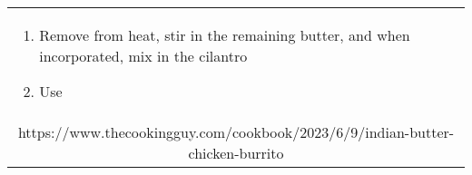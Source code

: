 \documentclass[web-recipes.tex]{subfiles}
\begin{document}
\begin{mdframed}[nobreak]
\begin{tabular}{l}
\begin{minipage}[t]{0.55\textwidth}
\begin{enumerate}
        \item Remove from heat, stir in the remaining butter, and when
          incorporated, mix in the cilantro
        \item Use
      \end{enumerate}
    \end{minipage} \vspace{3ex}\\
    \multicolumn{1}{c}{\small\ttfamily https://www.thecookingguy.com/cookbook/2023/6/9/indian-butter-chicken-burrito} \\
  \end{tabular}
\end{mdframed}
\end{document}
